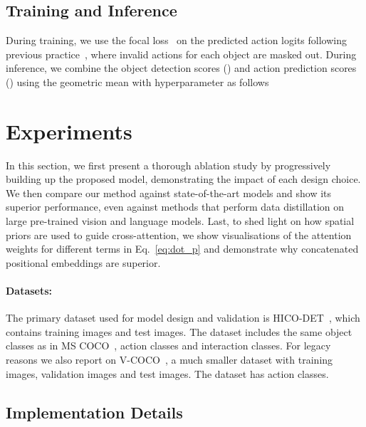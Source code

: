 \documentclass[10pt,twocolumn,letterpaper]{article}
\begin{document}
\subsection{Training and Inference}

During training, we use the focal loss~\cite{retinanet} on the predicted action logits following previous practice~\cite{upt, stip}, where invalid actions for each object are masked out. During inference, we combine the object detection scores () and action prediction scores () using the geometric mean with hyperparameter 
as follows


\section{Experiments}
\label{sec:experiments}

In this section, we first present a thorough ablation study by progressively building up the proposed model, demonstrating the impact of each design choice. We then compare our method against state-of-the-art models and show its superior performance, even against methods that perform data distillation on large pre-trained vision and language models. Last, to shed light on how spatial priors are used to guide cross-attention, we show visualisations of the attention weights for different terms in Eq.~\ref{eq:dot_p} and demonstrate why concatenated positional embeddings are superior.

\paragraph{Datasets:}
The primary dataset used for model design and validation is HICO-DET~\cite{hicodet}, which contains  training images and  test images. The dataset includes the same  object classes as in MS COCO~\cite{coco},  action classes and  interaction classes. For legacy reasons we also report on V-COCO~\cite{vcoco}, a much smaller dataset with  training images,  validation images and  test images. The dataset has  action classes.

\subsection{Implementation Details}
\end{document}
